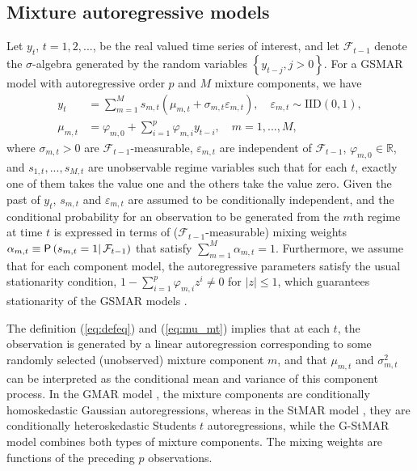 \documentclass[nojss]{jss} %
\begin{document}
\subsection{Mixture autoregressive models}\label{sec:mar}
Let $y_t$, $t=1,2,...$, be the real valued time series of interest, and let $\mathcal{F}_{t-1}$ denote the $\sigma$-algebra generated by the random variables $\left\lbrace y_{t-j},j>0\right\rbrace$. For a GSMAR model with autoregressive order $p$ and $M$ mixture components, we have
%
\begin{align}
y_t &= \sum_{m=1}^{M}s_{m,t}(\mu_{m,t}+\sigma_{m,t}\varepsilon_{m,t}), \quad \varepsilon_{m,t}\sim\text{IID}(0,1), \label{eq:defeq}\\
\mu_{m,t} &= \varphi_{m,0}+\sum_{i=1}^{p}\varphi_{m,i}y_{t-i}, \quad m=1,...,M, \label{eq:mu_mt}
\end{align}
%
where $\sigma_{m,t}>0$ are $\mathcal{F}_{t-1}$-measurable, $\varepsilon_{m,t}$ are independent of $\mathcal{F}_{t-1}$, $\varphi_{m,0}\in\mathbb{R}$, and $s_{1,t},...,s_{M,t}$ are unobservable regime variables such that for each $t$, exactly one of them takes the value one and the others take the value zero. Given the past of $y_t$, $s_{m,t}$ and $\varepsilon_{m,t}$ are assumed to be conditionally independent, and the conditional probability for an observation to be generated from the $m$th regime at time $t$ is expressed in terms of ($\mathcal{F}_{t-1}$-measurable) mixing weights $\alpha_{m,t}\equiv \mathsf{P}\left(s_{m,t}=1\right|\mathcal{F}_{t-1})$ that satisfy $\sum_{m=1}^{M}\alpha_{m,t}=1$. Furthermore, we assume that for each component model, the autoregressive parameters satisfy the usual stationarity condition, $1-\sum_{i=1}^p\varphi_{m,i}z^i\neq0$ for $|z|\leq 1$, which guarantees stationarity of the GSMAR models \citep[Theorem 1]{Virolainen:2020}.

The definition (\ref{eq:defeq}) and (\ref{eq:mu_mt}) implies that at each $t$, the observation is generated by a linear autoregression corresponding to some randomly selected (unobserved) mixture component $m$, and that $\mu_{m,t}$ and $\sigma_{m,t}^2$ can be interpreted as the conditional mean and variance of this component process. In the GMAR model \citep{Kalliovirta+Meitz+Saikkonen:2015}, the mixture components are conditionally homoskedastic Gaussian autoregressions, whereas in the StMAR model \citep{Meitz+Preve+Saikkonen:2021}, they are conditionally heteroskedastic Students $t$ autoregressions, while the G-StMAR model \citep{Virolainen:2020} combines both types of mixture components. The mixing weights are functions of the preceding $p$ observations.
\end{document}
